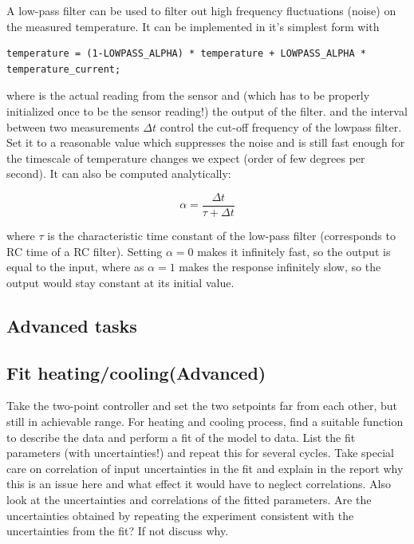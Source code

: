 \vspace{0.5cm}

A low-pass filter can be used to filter out high frequency fluctuations (noise) on the measured temperature. It can be implemented in it's simplest form with

\noindent\begin{minipage}{\textwidth}
\begin{lstlisting}[language=Arduino]
temperature = (1-LOWPASS_ALPHA) * temperature + LOWPASS_ALPHA * temperature_current;
\end{lstlisting}
\end{minipage}

where  is the actual reading from the sensor and  (which has to be properly initialized once to be the sensor reading!) the output of the filter.  and the interval between two measurements $\Delta t$ control the cut-off frequency of the lowpass filter. Set it to a reasonable value which suppresses the noise and is still fast enough for the timescale of temperature changes we expect (order of few degrees per second). It can also be computed analytically:

\begin{equation}
\alpha = \frac{\Delta t}{\tau + \Delta t}
\end{equation}

where $\tau$ is the characteristic time constant of the low-pass filter (corresponds to RC time of a RC filter). Setting $\alpha = 0$ makes it infinitely fast, so the output is equal to the input, where as $\alpha = 1$ makes the response infinitely slow, so the output would stay constant at its initial value.

\subsection{Advanced tasks}



\subsection{Fit heating/cooling(Advanced)}
Take the two-point controller and set the two setpoints far from each other, but still in achievable range. For heating and cooling process, find a suitable function to describe the data and perform a fit of the model to data. List the fit parameters (with uncertainties!) and repeat this for several cycles. Take special care on correlation of input uncertainties in the fit and explain in the report why this is an issue here and what effect it would have to neglect correlations. Also look at the uncertainties and correlations of the fitted parameters.
Are the uncertainties obtained by repeating the experiment consistent with the uncertainties from the fit? If not discuss why.

